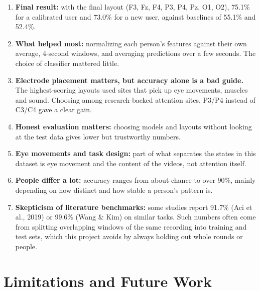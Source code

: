 \documentclass[12pt]{article}
\begin{document}
\begin{enumerate}
    \item \textbf{Final result:} with the final layout (F3, Fz, F4, P3, P4, Pz, O1, O2), 75.1\% for a calibrated user and 73.0\% for a new user, against baselines of 55.1\% and 52.4\%.
    \item \textbf{What helped most:} normalizing each person's features against their own average, 4-second windows, and averaging predictions over a few seconds. The choice of classifier mattered little.
    \item \textbf{Electrode placement matters, but accuracy alone is a bad guide.} The highest-scoring layouts used sites that pick up eye movements, muscles and sound. Choosing among research-backed attention sites, P3/P4 instead of C3/C4 gave a clear gain.
    \item \textbf{Honest evaluation matters:} choosing models and layouts without looking at the test data gives lower but trustworthy numbers.
    \item \textbf{Eye movements and task design:} part of what separates the states in this dataset is eye movement and the content of the videos, not attention itself.
    \item \textbf{People differ a lot:} accuracy ranges from about chance to over 90\%, mainly depending on how distinct and how stable a person's pattern is.
    \item \textbf{Skepticism of literature benchmarks:} some studies report 91.7\% (Aci et al., 2019) or 99.6\% (Wang \& Kim) on similar tasks. Such numbers often come from splitting overlapping windows of the same recording into training and test sets, which this project avoids by always holding out whole rounds or people.
\end{enumerate}

\section{Limitations and Future Work}
\end{document}
